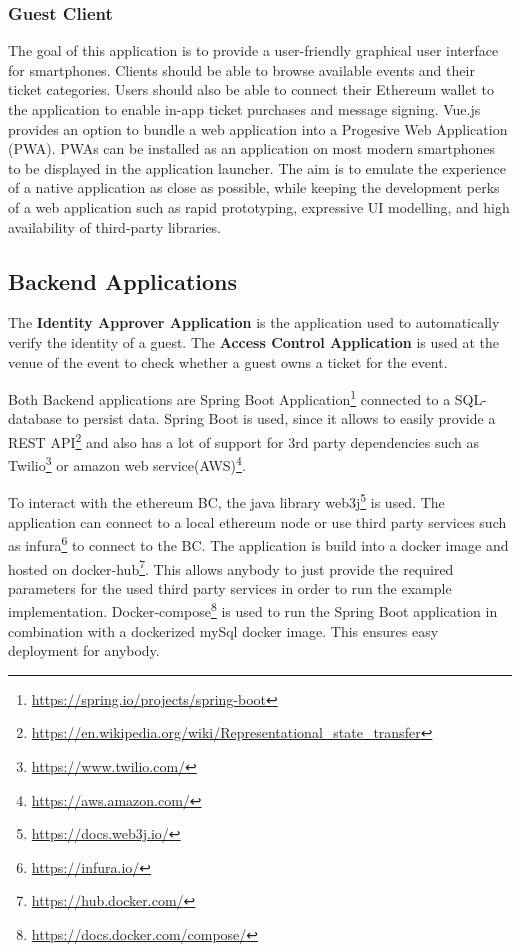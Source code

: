 \subsubsection{Guest Client}

The goal of this application is to provide a user-friendly graphical user interface for smartphones. Clients should be able to browse available events and their ticket categories. Users should also be able to connect their Ethereum wallet to the application to enable in-app ticket purchases and message signing. Vue.js provides an option to bundle a web application into a Progesive Web Application (PWA). PWAs can be installed as an application on most modern smartphones to be displayed in the application launcher. The aim is to emulate the experience of a native application as close as possible, while keeping the development perks of a web application such as rapid prototyping, expressive UI modelling, and high availability of third-party libraries.

\subsection{Backend Applications}

The \textbf{Identity Approver Application} is the application used to automatically verify the identity of a guest. The \textbf{Access Control Application} is used at the venue of the event to check whether a guest owns a ticket for the event. 
 
Both Backend applications are Spring Boot Application\footnote{\url{https://spring.io/projects/spring-boot}} connected to a SQL-database to persist data. Spring Boot is used, since it allows to easily provide a REST API\footnote{\url{https://en.wikipedia.org/wiki/Representational_state_transfer}} and also has a lot of support for 3rd party dependencies such as Twilio\footnote{\url{https://www.twilio.com/}} or amazon web service(AWS)\footnote{\url{https://aws.amazon.com/}}.

To interact with the ethereum BC, the java library web3j\footnote{\url{https://docs.web3j.io/}} is used. 
The application can connect to a local ethereum node or use third party services such as infura\footnote{\url{https://infura.io/}} to connect to the BC.
The application is build into a docker image and hosted on docker-hub\footnote{\url{https://hub.docker.com/}}. This allows anybody to just provide the required parameters for the used third party services in order to run the example implementation.  
Docker-compose\footnote{\url{https://docs.docker.com/compose/}} is used to run the Spring Boot application in combination with a dockerized mySql docker image. This ensures easy deployment for anybody.



